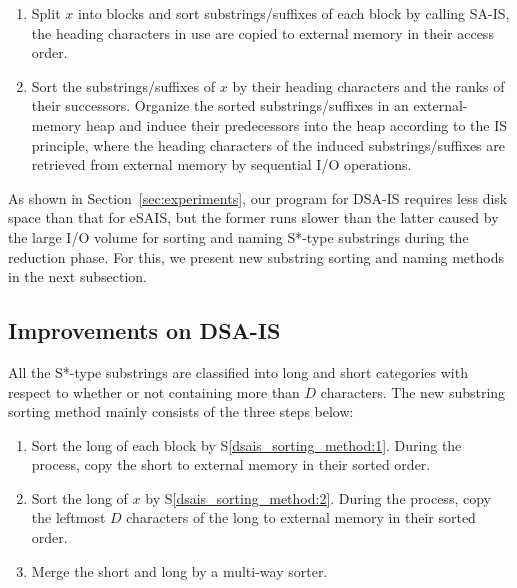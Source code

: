 \documentclass[10pt,journal,compsoc]{IEEEtran}
\begin{document}
\begin{enumerate}[S1]
	\item Split $x$ into blocks and sort substrings/suffixes of each block by calling SA-IS, the heading characters in use are copied to external memory in their access order. \label{dsais_sorting_method:1}
	\item Sort the substrings/suffixes of $x$ by their heading characters and the ranks of their successors. Organize the sorted substrings/suffixes in an external-memory heap and induce their predecessors into the heap according to the IS principle, where the heading characters of the induced substrings/suffixes are retrieved from external memory by sequential I/O operations.\label{dsais_sorting_method:2}
\end{enumerate}

As shown in Section~\ref{sec:experiments}, our program for DSA-IS requires less disk space than that for eSAIS, but the former runs slower than the latter caused by the large I/O volume for sorting and naming S*-type substrings during the reduction phase. For this, we present new substring sorting and naming methods in the next subsection.

\subsection{Improvements on DSA-IS}

All the S*-type substrings are classified into long and short categories with respect to whether or not containing more than $D$ characters. The new substring sorting method mainly consists of the three steps below:

\begin{enumerate}[S1']
	\item Sort the long of each block by S\ref{dsais_sorting_method:1}. During the process, copy the short to external memory in their sorted order.~\label{dsaism_sorting_method:1}
	
	\item Sort the long of $x$ by S\ref{dsais_sorting_method:2}. During the process, copy the leftmost $D$ characters of the long to external memory in their sorted order.~\label{dsaism_sorting_method:2}
	
	\item Merge the short and long by a multi-way sorter.~\label{dsaism_sorting_method:3}
\end{enumerate}
\end{document}
